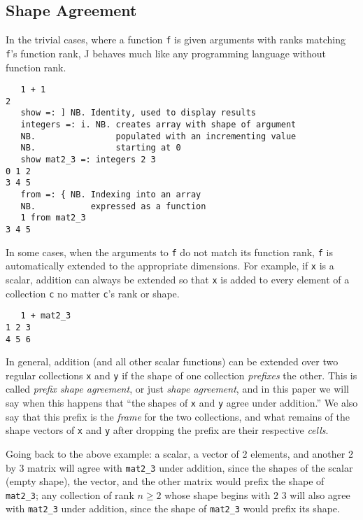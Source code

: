 \subsection{Shape Agreement}
In the trivial cases, where a function \texttt{f} is given arguments with ranks matching \texttt{f}'s function rank, 
J behaves much like any programming language without function rank. 

\begin{singlespacing}
\begin{small}
\begin{verbatim}
   1 + 1
2
   show =: ] NB. Identity, used to display results
   integers =: i. NB. creates array with shape of argument
   NB.                populated with an incrementing value
   NB.                starting at 0
   show mat2_3 =: integers 2 3
0 1 2
3 4 5
   from =: { NB. Indexing into an array
   NB.           expressed as a function
   1 from mat2_3
3 4 5
\end{verbatim}
\end{small}
\end{singlespacing}

In some cases, when the arguments to \texttt{f} do not match its function rank, \texttt{f} is automatically extended to the appropriate dimensions.
For example, if \texttt{x} is a scalar, addition can always be extended so that \texttt{x} is added to every element of a collection \texttt{c} 
no matter \texttt{c}'s rank or shape. 

\begin{singlespacing}
\begin{small}
\begin{verbatim}
   1 + mat2_3
1 2 3
4 5 6
\end{verbatim}
\end{small}
\end{singlespacing}

In general, addition (and all other scalar functions) can be extended over two regular collections \texttt{x} and \texttt{y}  
if the shape of one collection \textit{prefixes} the other.
This is called \textit{prefix shape agreement}, or just \textit{shape agreement}\cite{rankanduni}, 
and in this paper we will say when this happens that ``the shapes of \texttt{x} and \texttt{y} agree under addition.''
We also say that this prefix is the \textit{frame} for the two collections,
and what remains of the shape vectors of \texttt{x} and \texttt{y} after dropping the prefix are their respective \textit{cells}.

Going back to the above example: 
a scalar, a vector of 2 elements, and another 2 by 3 matrix will agree with \texttt{mat2\_3} under addition, 
since the shapes of the scalar (empty shape), the vector, and the other matrix would prefix the shape of \texttt{mat2\_3}; 
any collection of rank $n \ge 2$ whose shape begins with $2$ $3$ will also agree with 
\texttt{mat2\_3} under addition, since the shape of \texttt{mat2\_3} would prefix its shape.

